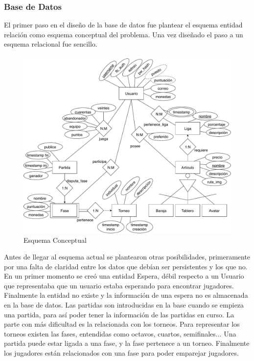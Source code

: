 \subsubsection{Base de Datos}
El primer paso en el diseño de la base de datos fue plantear el esquema entidad relación como esquema conceptual del problema. Una vez diseñado el paso a un esquema relacional fue sencillo.

\begin{figure}[H]
\centering
\includegraphics[scale = 0.5]{figuras/base_datos/diagrama-conceptual.pdf}
\caption{Esquema Conceptual}
\label{fig:diagramaConceptual}
\end{figure}

Antes de llegar al esquema actual se plantearon otras posibilidades, primeramente por una falta de claridad entre los datos que debían ser persistentes y los que no. En un primer momento se creó una entidad Espera, débil respecto a un Usuario que representaba que un usuario estaba esperando para encontrar jugadores. Finalmente la entidad no existe y la información de una espera no es almacenada en la base de datos. Las partidas son introducidas en la base cuando se empieza una partida, para así poder tener la información de las partidas en curso. La parte con más dificultad es la relacionada con los torneos. Para representar los torneos existen las fases, entendidas como octavos, cuartos, semifinales... Una partida puede estar ligada a una fase, y la fase pertenece a un torneo. Finalmente los jugadores están relacionados con una fase para poder emparejar jugadores.\\

